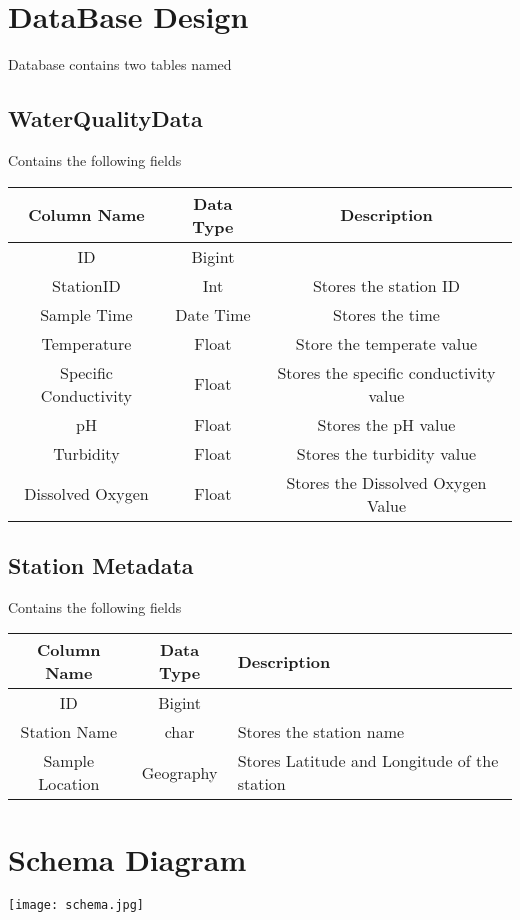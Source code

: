 \documentclass[a4paper]{article}
\begin{document}
\hspace{.5cm}
\begin{minipage}[t]{0.45\textwidth}
\section*{DataBase Design}
Database contains two tables named
\subsection{WaterQualityData}
 Contains the following fields
\begin{center}
\begin{tabu} { | c | c | c | }
\hline
{\scriptsize Column Name} & {\scriptsize Data Type} & {\scriptsize Description }\\
\hline
{\scriptsize ID} & {\scriptsize Bigint } &{ } \\
\hline
{\scriptsize StationID} & {\scriptsize Int} & {\scriptsize Stores the station ID} \\
\hline
{\scriptsize Sample Time} & {\scriptsize Date Time} & {\scriptsize Stores the time}  \\
\hline
{\scriptsize Temperature} & {\scriptsize Float} & {\scriptsize Store the temperate value} \\
\hline
{\scriptsize Specific Conductivity} & {\scriptsize Float} & {\scriptsize Stores the specific conductivity value}\\
\hline
{\scriptsize pH} & {\scriptsize Float} & {\scriptsize Stores the pH value} \\
\hline
{\scriptsize Turbidity} & {\scriptsize Float} & {\scriptsize Stores the turbidity value} \\
\hline
{\scriptsize Dissolved Oxygen} & {\scriptsize Float} & {\scriptsize Stores the Dissolved Oxygen Value} \\
\hline
\end{tabu}
\end{center}
\subsection{Station Metadata} 
 Contains the following fields
\begin{center}
\begin{tabu} { | c | c | p{5cm} |}
\hline
{\scriptsize Column Name} & {\scriptsize Data Type} & {\scriptsize Description }\\
\hline
{\scriptsize ID} & {\scriptsize Bigint } &{ } \\
\hline
{\scriptsize Station Name} & {\scriptsize char} & {\scriptsize Stores the station name} \\
\hline
{\scriptsize Sample Location} & {\scriptsize Geography} & {\scriptsize Stores Latitude and Longitude of the station}  \\
\hline
\end{tabu}
\end{center}
\section*{Schema Diagram}
\texttt{[image: schema.jpg]}
\end{minipage}
\newpage
\end{document}
